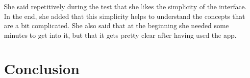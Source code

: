 \documentclass[a4paper,12pt, oneside]{article}
\begin{document}
She said repetitively during the test that she likes the simplicity of the interface.
In the end, she added that this simplicity helps to understand the concepts that are a bit complicated.
She also said that at the beginning she needed some minutes to get into it, but that it gets pretty clear after having used the app.


\section{Conclusion}

\clearpage


\end{document}
